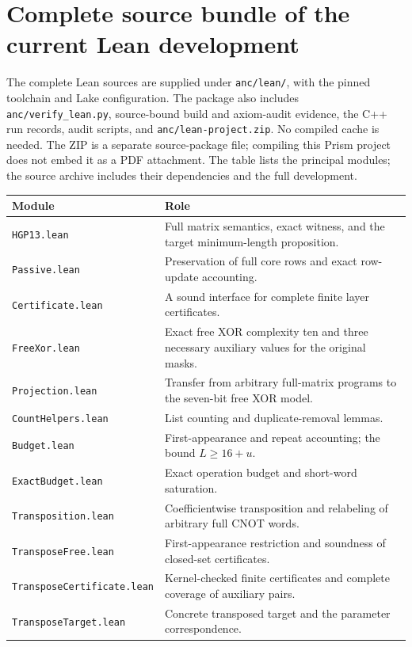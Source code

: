 \documentclass[11pt]{article}
\begin{document}
\appendix
\section{Complete source bundle of the current Lean development}\label{app:lean}
The complete Lean sources are supplied under \texttt{anc/lean/}, with
the pinned toolchain and Lake configuration. The package also includes
\texttt{anc/verify\_lean.py}, source-bound build and axiom-audit evidence,
the C++ run records, audit scripts, and \texttt{anc/lean-project.zip}.
No compiled cache is needed. The ZIP is a separate source-package file;
compiling this Prism project does not embed it as a PDF attachment.
The table lists the principal modules; the source archive includes their
dependencies and the full development.
{\footnotesize\begin{longtable}{@{}p{.40\linewidth}p{.56\linewidth}@{}}\toprule
Module&Role\\\midrule\endhead
\texttt{HGP13.lean}&Full matrix semantics, exact witness, and the target
minimum-length proposition.\\
\texttt{Passive.lean}&Preservation of full core rows and exact row-update
accounting.\\
\texttt{Certificate.lean}&A sound interface for complete finite layer
certificates.\\
\texttt{FreeXor.lean}&Exact free XOR complexity ten and three necessary
auxiliary values for the original masks.\\
\texttt{Projection.lean}&Transfer from arbitrary full-matrix programs to
the seven-bit free XOR model.\\
\texttt{CountHelpers.lean}&List counting and duplicate-removal lemmas.\\
\texttt{Budget.lean}&First-appearance and repeat accounting; the bound
$L\geq16+u$.\\
\texttt{ExactBudget.lean}&Exact operation budget and short-word saturation.\\
\texttt{Transposition.lean}&Coefficientwise transposition and relabeling
of arbitrary full CNOT words.\\
\texttt{TransposeFree.lean}&First-appearance restriction and soundness of
closed-set certificates.\\
\texttt{TransposeCertificate.lean}&Kernel-checked finite certificates and
complete coverage of auxiliary pairs.\\
\texttt{TransposeTarget.lean}&Concrete transposed target and the parameter
correspondence.\\

\end{longtable}}
\end{document}

